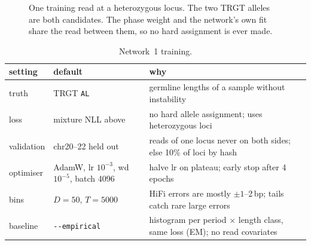 \documentclass[10pt,a4paper]{article}
\begin{document}
\begin{figure}[H]
\centering
{}
\caption{One training read at a heterozygous locus. The two TRGT alleles are both candidates. The phase weight and
the network's own fit share the read between them, so no hard assignment is ever made.}
\end{figure}

\begin{table}[H]
\centering\small
\begin{tabularx}{\textwidth}{@{}l l L@{}}
\toprule
setting & default & why\\
\midrule
truth & TRGT \texttt{AL} & germline lengths of a sample without instability\\
loss & mixture NLL above & no hard allele assignment; uses heterozygous loci\\
validation & chr20--22 held out & reads of one locus never on both sides; else 10\% of loci by hash\\
optimiser & AdamW, lr $10^{-3}$, wd $10^{-5}$, batch 4096 & halve lr on plateau; early stop after 4 epochs\\
bins & $D=50$, $T=5000$ & HiFi errors are mostly $\pm1$--2\,bp; tails catch rare large errors\\
baseline & \texttt{-{}-empirical} & histogram per period $\times$ length class, same loss (EM); no read covariates\\
\bottomrule
\end{tabularx}
\caption{Network~1 training.}
\end{table}
\end{document}
